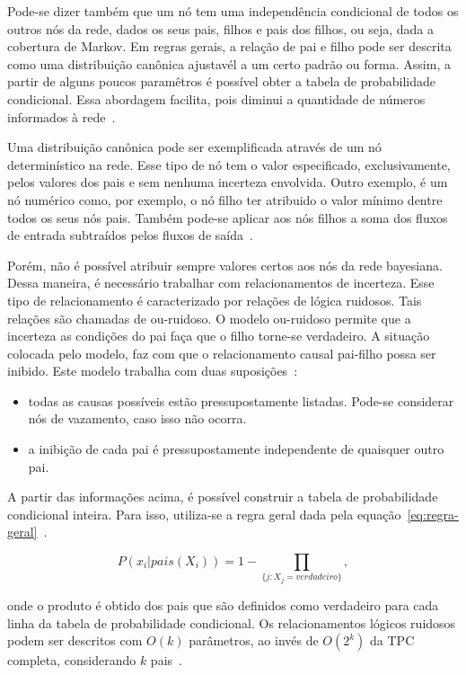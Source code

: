 Pode-se dizer também que um nó tem uma independência condicional de todos os outros nós da rede, dados os seus pais, filhos e pais dos filhos, ou seja, dada a cobertura de Markov. Em regras gerais, a relação de pai e filho pode ser descrita como uma distribuição canônica ajustavél a um certo padrão ou forma. Assim, a partir de alguns poucos paramêtros é possível obter a tabela de probabilidade condicional. Essa abordagem facilita, pois diminui a quantidade de números informados à rede~\cite{russell:2002}.

Uma distribuição canônica pode ser exemplificada através de um nó determinístico na rede. Esse tipo de nó tem o valor especificado, exclusivamente, pelos valores dos pais e sem nenhuma incerteza envolvida. Outro exemplo, é um nó numérico como, por exemplo, o nó filho ter atribuido o valor mínimo dentre todos os seus nós pais. Também pode-se aplicar aos nós filhos a soma dos fluxos de entrada subtraídos pelos fluxos de saída~\cite{russell:2002}.

Porém, não é possível atribuir sempre valores certos aos nós da rede bayesiana. Dessa maneira, é necessário trabalhar com relacionamentos de incerteza. Esse tipo de relacionamento é caracterizado por relações de lógica ruidosos. Tais relações são chamadas de ou-ruidoso. O modelo ou-ruidoso permite que a incerteza as condições do pai faça que o filho torne-se verdadeiro. A situação colocada pelo modelo, faz com que o relacionamento causal pai-filho possa ser inibido. Este modelo trabalha com duas suposições~\cite{russell:2002}:

\begin{itemize}
    \item todas as causas possíveis estão pressupostamente listadas. Pode-se considerar nós de vazamento, caso isso não ocorra.
    \item a inibição de cada pai é pressupostamente independente de quaisquer outro pai.
\end{itemize}

A partir das informações acima, é possível construir a tabela de probabilidade condicional inteira. Para isso, utiliza-se a regra geral dada pela equação~\ref{eq:regra-geral}~\cite{russell:2002}.

\begin{equation}
    \label{eq:regra-geral}
    P(x_i|pais(X_i)) = 1 - \prod_{\{j:X_j = verdadeiro\}} ,
\end{equation}

onde o produto é obtido dos pais que são definidos como verdadeiro para cada linha da tabela de probabilidade condicional. Os relacionamentos lógicos ruidosos podem ser descritos com $O(k)$ parâmetros, ao invés de $O(2^k)$ da TPC completa, considerando $k$ pais~\cite{russell:2002}.

